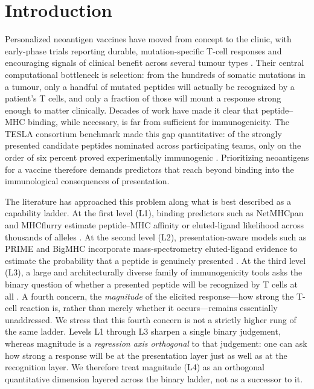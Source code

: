 \section{Introduction}
\label{sec:intro}

Personalized neoantigen vaccines have moved from concept to the clinic, with
early-phase trials reporting durable, mutation-specific T-cell responses and
encouraging signals of clinical benefit across several tumour types
\cite{Sahin2023,NatRevImmunol2023}. Their central computational bottleneck is
selection: from the hundreds of somatic mutations in a tumour, only a handful of
mutated peptides will actually be recognized by a patient's T cells, and only a
fraction of those will mount a response strong enough to matter clinically.
Decades of work have made it clear that peptide--MHC binding, while necessary, is
far from sufficient for immunogenicity. The TESLA consortium benchmark made this
gap quantitative: of the strongly presented candidate peptides nominated across
participating teams, only on the order of six percent proved experimentally
immunogenic \cite{TESLA2020}. Prioritizing neoantigens for a vaccine therefore
demands predictors that reach beyond binding into the immunological consequences
of presentation.

The literature has approached this problem along what is best described as a
capability ladder. At the first level (L1), binding predictors such as
NetMHCpan and MHCflurry estimate peptide--MHC affinity or eluted-ligand
likelihood across thousands of alleles \cite{NetMHCpan2020,MHCflurry2020}. At
the second level (L2), presentation-aware models such as PRIME and BigMHC
incorporate mass-spectrometry eluted-ligand evidence to estimate the probability
that a peptide is genuinely presented \cite{PRIME2023,BigMHC2023}. At the third
level (L3), a large and architecturally diverse family of immunogenicity tools
asks the binary question of whether a presented peptide will be recognized by T
cells at all
\cite{DeepImmuno2021,deepHLApan2019,IMPROVE2024,PredIG2025,ICERFIRE2024,NeoaPred2024,ImmunoStruct2025,NetTepi2014,Seq2Neo2022,TSCAPE2025,CNNeoPP2026}.
A fourth concern, the \emph{magnitude} of the elicited response---how strong the
T-cell reaction is, rather than merely whether it occurs---remains essentially
unaddressed. We stress that this fourth concern is not a strictly higher rung of
the same ladder. Levels L1 through L3 sharpen a single binary judgement, whereas
magnitude is a \emph{regression axis orthogonal} to that judgement: one can ask
how strong a response will be at the presentation layer just as well as at the
recognition layer. We therefore treat magnitude (L4) as an orthogonal
quantitative dimension layered across the binary ladder, not as a successor to
it.

